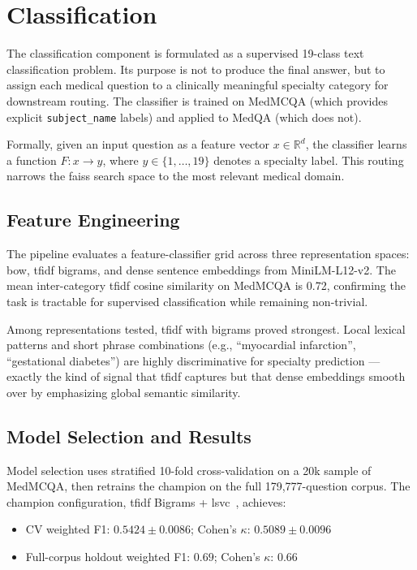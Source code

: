 \section{Classification}
\label{sec:classification}

The classification component is formulated as a supervised 19-class text classification problem. Its purpose is not to produce the final answer, but to assign each medical question to a clinically meaningful specialty category for downstream routing. The classifier is trained on MedMCQA (which provides explicit \texttt{subject\_name} labels) and applied to MedQA (which does not).

Formally, given an input question as a feature vector $x \in \mathbb{R}^d$, the classifier learns a function $F: x \rightarrow y$, where $y \in \{1,\ldots,19\}$ denotes a specialty label. This routing narrows the \gls{faiss} search space to the most relevant medical domain.

\subsection{Feature Engineering}

The pipeline evaluates a feature-classifier grid across three representation spaces: \gls{bow}, \gls{tfidf} bigrams, and dense sentence embeddings from MiniLM-L12-v2. The mean inter-category \gls{tfidf} cosine similarity on MedMCQA is 0.72, confirming the task is tractable for supervised classification while remaining non-trivial.

Among representations tested, \gls{tfidf} with bigrams proved strongest. Local lexical patterns and short phrase combinations (e.g., ``myocardial infarction'', ``gestational diabetes'') are highly discriminative for specialty prediction --- exactly the kind of signal that \gls{tfidf} captures but that dense embeddings smooth over by emphasizing global semantic similarity.

\subsection{Model Selection and Results}

Model selection uses stratified 10-fold cross-validation on a 20k sample of MedMCQA, then retrains the champion on the full 179,777-question corpus. The champion configuration, \gls{tfidf} Bigrams + \gls{lsvc}~\cite{fan_liblinear_2008}, achieves:

\begin{itemize}
  \item CV weighted F1: $0.5424 \pm 0.0086$; Cohen's $\kappa$: $0.5089 \pm 0.0096$
  \item Full-corpus holdout weighted F1: $0.69$; Cohen's $\kappa$: $0.66$
\end{itemize}

